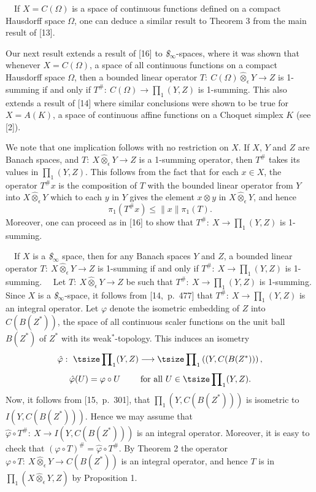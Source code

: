 \ \ If $X=C(\Omega)$ is a space of
continuous functions defined on a compact Hausdorff space $\Omega$, 
one
can deduce a similar result to Theorem 3 from the main result of [13].

\medskip

Our next result extends a result of [16] to {\it \$}$_\infty$-spaces,
where it was shown that whenever
$X=C(\Omega)$, a space of all continuous functions on a compact
Hausdorff space $\Omega$, then a bounded linear operator $T:\
C(\Omega)\hat \otimes_\epsilon Y\longrightarrow Z$ is 1-summing if and 
only
if $T^\#:\ C(\Omega)\longrightarrow \prod_1(Y,Z)$ is 1-summing.  This 
also
extends a result of [14] where similar conclusions were shown to be 
true
for $X=A(K)$, a space of continuous affine functions on a Choquet
simplex $K$ (see [2]).

\medskip

We note that one implication follows with no restriction on $X$.
If $X$, $Y$ and $Z$ are Banach spaces, and $T:\ X\hat \otimes_\epsilon
Y\longrightarrow Z$ is a 1-summing operator, then $T^\#$ takes its
values in $\prod_1(Y,Z)$.  This follows from the fact that for each
$x\in X$, the operator $T^\#x$ is the composition of $T$ with the
bounded linear operator from $Y$ into $X\hat \otimes_\epsilon Y$ which
to each $y$ in $Y$ gives the element $x\otimes y$ in $X\hat
\otimes_\epsilon Y$, and hence
$$
\pi_1(T^\#x)\leq \parallel x\parallel \pi_1(T).
$$
Moreover, one can proceed as in [16] to show that $T^\#:\
X\longrightarrow \prod_1(Y,Z)$ is 1-summing.

\medskip

\ \ If $X$ is a {\it \$}$_\infty$ space, then
for any Banach spaces $Y$ and $Z$, a bounded linear operator $T:\ 
X\hat
\otimes_\epsilon Y\longrightarrow Z$ is 1-summing if and only if 
$T^\#:\
X\longrightarrow \prod_1(Y,Z)$ is 1-summing.
\medskip
\noindent {\bf Proof:}\ \ Let $T:\ X\hat \otimes_\epsilon 
Y\longrightarrow
Z$ be such that $T^\#:\ X\longrightarrow \prod_1(Y,Z)$ is 1-summing.  
Since
$X$ is a {\it \$}$_\infty$-space, it follows from [14,~p.~477] that
$T^\#:\ X\longrightarrow \prod_1(Y,Z)$ is an integral operator. Let
$\varphi$ denote the isometric embedding of $Z$ into
$C\left(B(Z^*)\right)$, the space of all continuous scaler functions 
on
the unit ball $B(Z^*)$ of $Z^*$ with its weak$^*$-topology.  This 
induces
an isometry
$$
\hat \varphi:\ {\tsize\prod\nolimits}_1(Y,Z)\longrightarrow
{\tsize\prod\nolimits}_1\left((Y,C(B(Z^*))\right),
$$
$$
\hat \varphi (U)=\varphi\circ U\qquad \text { for all }U\in
{\tsize \prod\nolimits}_1(Y,Z).
$$
Now, it follows from [15,~p.~301], that 
$\prod_1\left(Y,C(B(Z^*))\right)$
is isometric to $I\left(Y, C(B(Z^*))\right)$. Hence we may assume that
$\hat \varphi \circ T^\#:\ X\longrightarrow I\left(Y,C(B(Z^*))\right)$
is an integral operator.  Moreover, it is easy to check that
$(\varphi\circ T)^\#=\hat \varphi \circ T^\#$.  By Theorem 2 the
operator $\varphi \circ T:\ X\hat \otimes_\epsilon Y\longrightarrow
C(B(Z^*))$ is an integral operator, and hence $T$ is in
$\prod_1\left(X\hat \otimes_\epsilon Y, Z\right)$ by Proposition 1.  
\endproof

